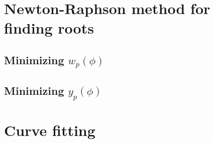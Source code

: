 \section{Newton-Raphson method for finding roots}

\subsection{\texorpdfstring{Minimizing $w_p(\phi)$}{}}

\subsection{\texorpdfstring{Minimizing $y_p(\phi)$}{}}

\section{Curve fitting}